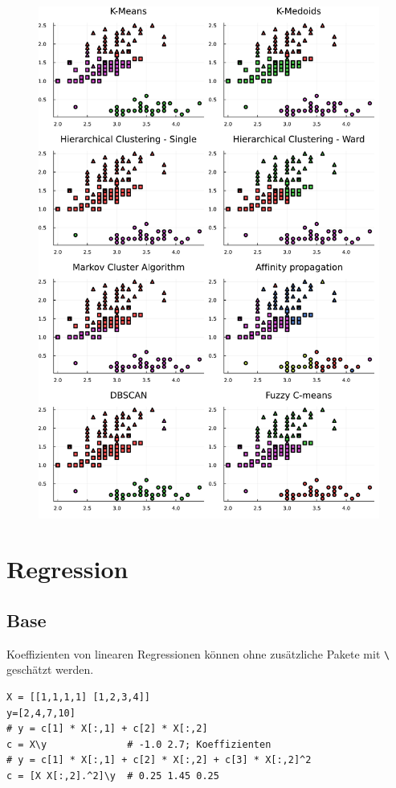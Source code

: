 \documentclass[10pt,twocolumn]{scrartcl}
\begin{document}
\begin{figure}[ht]
  \centering
  \includegraphics[width=.95\columnwidth]{cluster.pdf}
\end{figure}


\section{Regression}

\subsection{Base}

Koeffizienten von linearen Regressionen können ohne zusätzliche Pakete mit
\lstinline|\| geschätzt werden.

\begin{lstlisting}
X = [[1,1,1,1] [1,2,3,4]]
y=[2,4,7,10]
# y = c[1] * X[:,1] + c[2] * X[:,2]
c = X\y              # -1.0 2.7; Koeffizienten
# y = c[1] * X[:,1] + c[2] * X[:,2] + c[3] * X[:,2]^2
c = [X X[:,2].^2]\y  # 0.25 1.45 0.25
\end{lstlisting}
\end{document}
